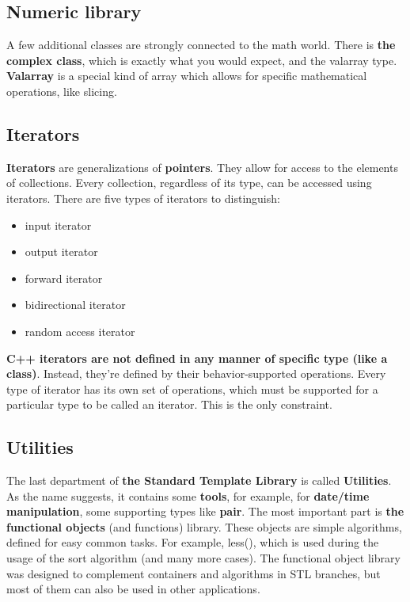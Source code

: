 \subsection{Numeric library} %
A few additional classes are strongly connected to the math world. There is \textbf{the complex class}, 
which is exactly what you would expect, and the valarray type. \textbf{Valarray} is a special kind of 
array which allows for specific mathematical operations, like slicing.

\subsection{Iterators} %
\textbf{Iterators} are generalizations of \textbf{pointers}. They allow for access to the 
elements of collections. Every collection, regardless of its type, can be accessed using iterators. 
There are five types of iterators to distinguish:
\begin{itemize}
    \item input iterator
    \item output iterator
    \item forward iterator
    \item bidirectional iterator
    \item random access iterator
\end{itemize}
\textbf{C++ iterators are not defined in any manner of specific type (like a class)}. Instead, 
they’re defined by their behavior-supported operations. Every type of iterator has its own set of operations, 
which must be supported for a particular type to be called an iterator. This is the only constraint.

\subsection{Utilities} %
The last department of \textbf{the Standard Template Library} is called \textbf{Utilities}. 
As the name suggests, it contains some \textbf{tools}, for example, for \textbf{date/time manipulation}, 
some supporting types like \textbf{pair}. The most important part is \textbf{the functional objects} 
(and functions) library. These objects are simple algorithms, defined for easy common tasks. 
For example, less(), which is used during the usage of the sort algorithm (and many more cases). 
The functional object library was designed to complement containers and algorithms in STL branches, 
but most of them can also be used in other applications.
